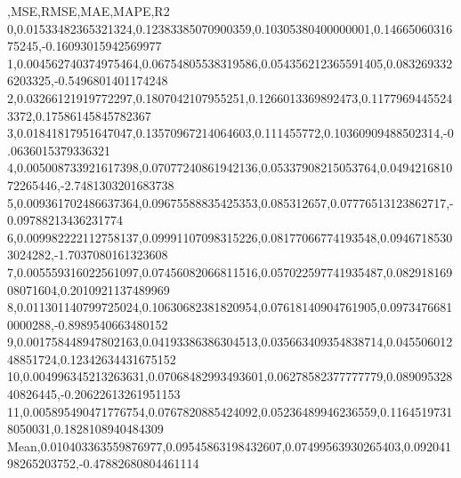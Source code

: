 ,MSE,RMSE,MAE,MAPE,R2
0,0.01533482365321324,0.12383385070900359,0.10305380400000001,0.1466506031675245,-0.16093015942569977
1,0.004562740374975464,0.06754805538319586,0.054356212365591405,0.0832693326203325,-0.5496801401174248
2,0.03266121919772297,0.1807042107955251,0.1266013369892473,0.11779694455243372,0.17586145845782367
3,0.01841817951647047,0.13570967214064603,0.111455772,0.10360909488502314,-0.0636015379336321
4,0.005008733921617398,0.07077240861942136,0.05337908215053764,0.049421681072265446,-2.7481303201683738
5,0.009361702486637364,0.09675588835425353,0.085312657,0.07776513123862717,-0.09788213436231774
6,0.009982222112758137,0.09991107098315226,0.08177066774193548,0.09467185303024282,-1.7037080161323608
7,0.005559316022561097,0.07456082066811516,0.057022597741935487,0.08291816908071604,0.2010921137489969
8,0.011301140799725024,0.10630682381820954,0.07618140904761905,0.09734766810000288,-0.8989540663480152
9,0.001758448947802163,0.04193386386304513,0.035663409354838714,0.04550601248851724,0.12342634431675152
10,0.004996345213263631,0.07068482993493601,0.06278582377777779,0.08909532840826445,-0.20622613261951153
11,0.005895490471776754,0.0767820885424092,0.05236489946236559,0.11645197318050031,0.1828108940484309
Mean,0.010403363559876977,0.09545863198432607,0.07499563930265403,0.09204198265203752,-0.47882680804461114
